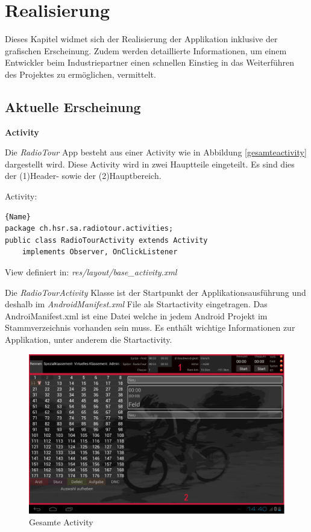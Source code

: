 \chapter{Realisierung}
\label{ref:realisierung}
Dieses Kapitel widmet sich der Realisierung der Applikation inklusive der grafischen Erscheinung. Zudem werden detaillierte Informationen, um einem Entwickler beim Industriepartner einen schnellen Einstieg in das Weiterführen des Projektes zu ermöglichen, vermittelt.


\section{Aktuelle Erscheinung}
\textbf{Activity}

Die \textit{RadioTour} App besteht aus einer Activity wie in Abbildung \ref{gesamteactivity} dargestellt wird. Diese Activity wird in zwei Hauptteile eingeteilt. Es sind dies der (1)Header- sowie der (2)Hauptbereich. 

Activity:
\begin{lstlisting}{Name}
package ch.hsr.sa.radiotour.activities;
public class RadioTourActivity extends Activity 
	implements Observer, OnClickListener
\end{lstlisting}


View definiert in:
\textit{res/layout/base\_activity.xml}

Die \textit{RadioTourActivity} Klasse ist der Startpunkt der Applikationsausführung und deshalb im \textit{AndroidManifest.xml} File als Startactivity eingetragen. Das AndroiManifest.xml ist eine Datei welche in jedem Android Projekt im Stammverzeichnis vorhanden sein muss. Es enthält wichtige Informationen zur Applikation, unter anderem die Startactivity.


\begin{figure}[h!]
\caption{Gesamte Activity}
\label{fig:gesamteactivity}
\centering
\includegraphics[scale=0.8]{07anhang/images/dev_activity.png}
\end{figure}

